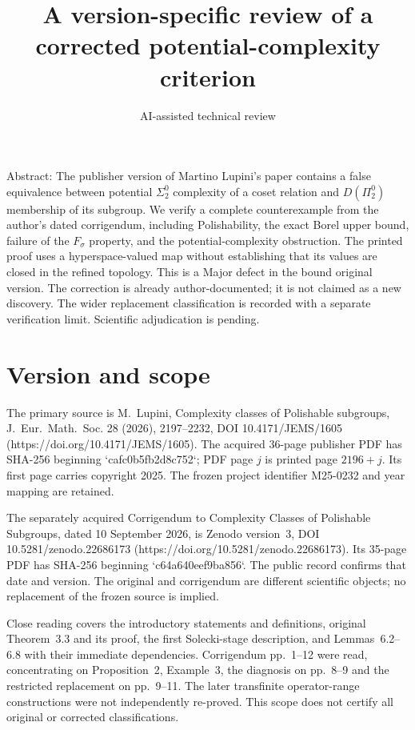 \documentclass[10pt]{article}
\title{A version-specific review of a corrected
potential-complexity criterion}
\author{AI-assisted technical review}
\date{}
\begin{document}
\maketitle
Abstract: The publisher version of Martino Lupini’s paper contains a false equivalence between potential \(\Sigma^0_2\) complexity of a coset relation and \(D(\Pi^0_2)\) membership of its subgroup. We verify a complete counterexample from the author’s dated corrigendum, including Polishability, the exact Borel upper bound, failure of the \(F_\sigma\) property, and the potential-complexity obstruction. The printed proof uses a hyperspace-valued map without establishing that its values are closed in the refined topology. This is a Major defect in the bound original version. The correction is already author-documented; it is not claimed as a new discovery. The wider replacement classification is recorded with a separate verification limit. Scientific adjudication is pending.\par
\section*{Version and scope}
The primary source is M. Lupini, Complexity classes of Polishable subgroups, J. Eur. Math. Soc. 28 (2026), 2197–2232, DOI 10.4171/JEMS/1605 (https://doi.org/10.4171/JEMS/1605). The acquired 36-page publisher PDF has SHA-256 beginning `cafc0b5fb2d8c752`; PDF page \(j\) is printed page \(2196+j\). Its first page carries copyright 2025. The frozen project identifier M25-0232 and year mapping are retained.\par
The separately acquired Corrigendum to Complexity Classes of Polishable Subgroups, dated 10 September 2026, is Zenodo version 3, DOI 10.5281/zenodo.22686173 (https://doi.org/10.5281/zenodo.22686173). Its 35-page PDF has SHA-256 beginning `c64a640eef9ba856`. The public record confirms that date and version. The original and corrigendum are different scientific objects; no replacement of the frozen source is implied.\par
Close reading covers the introductory statements and definitions, original Theorem 3.3 and its proof, the first Solecki-stage description, and Lemmas 6.2–6.8 with their immediate dependencies. Corrigendum pp. 1–12 were read, concentrating on Proposition 2, Example 3, the diagnosis on pp. 8–9 and the restricted replacement on pp. 9–11. The later transfinite operator-range constructions were not independently re-proved. This scope does not certify all original or corrected classifications.\par
\end{document}
